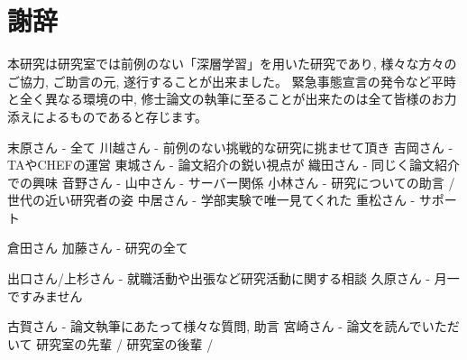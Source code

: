 
\clearpage

\chapter*{謝辞} \label{sec:Acknowledgement}

本研究は研究室では前例のない「深層学習」を用いた研究であり, 様々な方々のご協力, ご助言の元, 遂行することが出来ました。
緊急事態宣言の発令など平時と全く異なる環境の中, 修士論文の執筆に至ることが出来たのは全て皆様のお力添えによるものであると存じます。


末原さん - 全て
川越さん - 前例のない挑戦的な研究に挑ませて頂き
吉岡さん - TAやCHEFの運営
東城さん - 論文紹介の鋭い視点が
織田さん - 同じく論文紹介での興味
音野さん - 
山中さん - サーバー関係
小林さん - 研究についての助言 / 世代の近い研究者の姿
中居さん - 学部実験で唯一見てくれた
重松さん - サポート

倉田さん
加藤さん - 研究の全て

出口さん/上杉さん - 就職活動や出張など研究活動に関する相談
久原さん - 月一ですみません

古賀さん - 論文執筆にあたって様々な質問, 助言
宮崎さん - 論文を読んでいただいて
研究室の先輩 / 
研究室の後輩 /